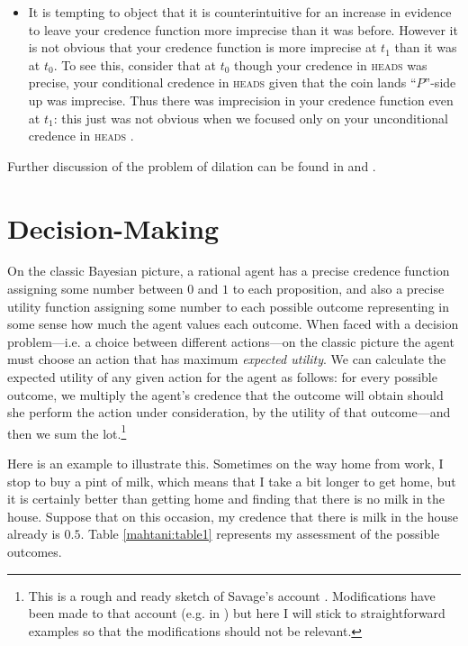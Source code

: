 \begin{itemize}
  \item It is tempting to object that it is counterintuitive for an increase in evidence to leave your credence function more imprecise than it was before. However it is not obvious that your credence function is more imprecise at $t_1$ than it was at $t_0$. To see this, consider that at $t_0$ though your credence in \textsc{heads} was precise, your conditional credence in \textsc{heads} given that the coin lands ``$P$''-side up was imprecise. Thus there was imprecision in your credence function even at $t_1$: this just was not obvious when we focused only on your unconditional credence in \textsc{heads} \citep{bradleyMS}.
\end{itemize}
	

Further discussion of the problem of dilation can be found in \citet{bradleyMS,bradleysteele2014a,dodd2013,Joyce2010} and \citet{pedersonwheeler2014}.


\section{Decision-Making}

On the classic Bayesian picture, a rational agent has a precise credence function assigning some number between $0$ and $1$ to each proposition, and also a precise utility function assigning some number to each possible outcome representing in some sense how much the agent values each outcome. When faced with a decision problem---i.e. a choice between different actions---on the classic picture the agent must choose an action that has maximum \textit{expected utility}. We can calculate the expected utility of any given action for the agent as follows: for every possible outcome, we multiply the agent's credence that the outcome will obtain should she perform the action under consideration, by the utility of that outcome---and then we sum the lot.\footnote{This is a rough and ready sketch of Savage's account \citep{savage1954}. Modifications have been made to that account (e.g. in \citealp{jeffrey1965}) but here I will stick to straightforward examples so that the modifications should not be relevant.} 
  
Here is an example to illustrate this. Sometimes on the way home from work, I stop to buy a pint of milk, which means that I take a bit longer to get home, but it is certainly better than getting home and finding that there is no milk in the house. Suppose that on this occasion, my credence that there is milk in the house already is $0.5$. Table \ref{mahtani:table1} represents my assessment of the possible outcomes. 

